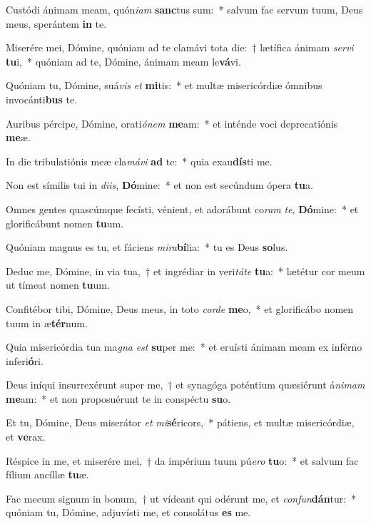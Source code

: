 \item Custódi ánimam meam, quón\textit{i}\textit{am} \textbf{sanc}tus sum:~* salvum fac servum tuum, Deus meus, sperántem \textbf{in} te.
\item Miserére mei, Dómine, quóniam ad te clamávi tota die:~† lætífica ánimam \textit{ser}\textit{vi} \textbf{tu}i,~* quóniam ad te, Dómine, ánimam meam le\textbf{vá}vi.
\item Quóniam tu, Dómine, suá\textit{vis} \textit{et} \textbf{mi}tis:~* et multæ misericórdiæ ómnibus invocánti\textbf{bus} te.
\item Auribus pércipe, Dómine, orati\textit{ó}\textit{nem} \textbf{me}am:~* et inténde voci deprecatiónis \textbf{me}æ.
\item In die tribulatiónis meæ cla\textit{má}\textit{vi} \textbf{ad} te:~* quia exau\textbf{dís}ti me.
\item Non est símilis tui in \textit{di}\textit{is}, \textbf{Dó}mine:~* et non est secúndum ópera \textbf{tu}a.
\item Omnes gentes quascúmque fecísti, vénient, et adorábunt co\textit{ram} \textit{te}, \textbf{Dó}mine:~* et glorificábunt nomen \textbf{tu}um.
\item Quóniam magnus es tu, et fáciens \textit{mi}\textit{ra}\textbf{bí}lia:~* tu es Deus \textbf{so}lus.
\item Deduc me, Dómine, in via tua,~† et ingrédiar in veri\textit{tá}\textit{te} \textbf{tu}a:~* lætétur cor meum ut tímeat nomen \textbf{tu}um.
\item Confitébor tibi, Dómine, Deus meus, in toto \textit{cor}\textit{de} \textbf{me}o,~* et glorificábo nomen tuum in æ\textbf{tér}num.
\item Quia misericórdia tua ma\textit{gna} \textit{est} \textbf{su}per me:~* et eruísti ánimam meam ex inférno inferi\textbf{ó}ri.
\item Deus iníqui insurrexérunt super me,~† et synagóga poténtium quæsiérunt á\textit{ni}\textit{mam} \textbf{me}am:~* et non proposuérunt te in conspéctu \textbf{su}o.
\item Et tu, Dómine, Deus miserátor \textit{et} \textit{mi}\textbf{sé}ricors,~* pátiens, et multæ misericórdiæ, et \textbf{ve}rax.
\item Réspice in me, et miserére mei,~† da impérium tuum pú\textit{e}\textit{ro} \textbf{tu}o:~* et salvum fac fílium ancíllæ \textbf{tu}æ.
\item Fac mecum signum in bonum,~† ut vídeant qui odérunt me, et \textit{con}\textit{fun}\textbf{dán}tur:~* quóniam tu, Dómine, adjuvísti me, et consolátus \textbf{es} me.
